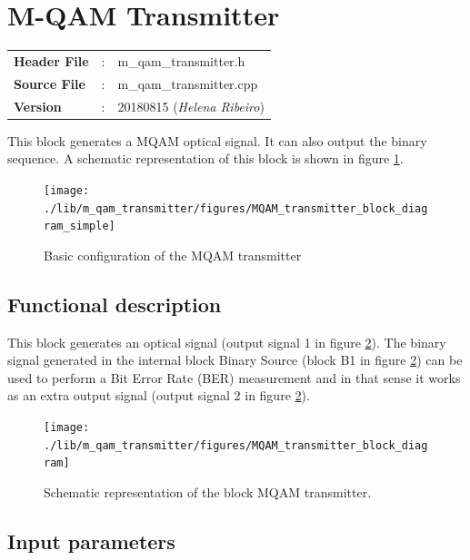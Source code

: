 \clearpage

\section{M-QAM Transmitter}

\begin{tcolorbox}	
	\begin{tabular}{p{2.75cm} p{0.2cm} p{10.5cm}} 	
		\textbf{Header File}   &:& m\_qam\_transmitter.h \\
		\textbf{Source File}   &:& m\_qam\_transmitter.cpp \\
        \textbf{Version}       &:& 20180815 (\emph{Helena Ribeiro})\\
	\end{tabular}
\end{tcolorbox}

This block generates a MQAM optical signal. It can also output the binary sequence. A schematic representation of this block is shown in figure \ref{MQAM_transmitter_block_diagram_simple}.

\begin{figure}[h]
	\centering
	\texttt{[image: ./lib/m\_qam\_transmitter/figures/MQAM\_transmitter\_block\_diagram\_simple]}
	\caption{Basic configuration of the MQAM transmitter}\label{MQAM_transmitter_block_diagram_simple}
\end{figure}

\subsection*{Functional description}

This block generates an optical signal (output signal 1 in figure \ref{MQAM_transmitter_block_diagram}). The binary signal generated in the internal block Binary Source (block B1 in figure \ref{MQAM_transmitter_block_diagram}) can be used to perform a Bit Error Rate (BER) measurement and in that sense it works as an extra output signal (output signal 2 in figure \ref{MQAM_transmitter_block_diagram}).

\begin{figure}[h]
	\centering
	\texttt{[image: ./lib/m\_qam\_transmitter/figures/MQAM\_transmitter\_block\_diagram]}
	\caption{Schematic representation of the block MQAM transmitter.}\label{MQAM_transmitter_block_diagram}
\end{figure}

\subsection*{Input parameters}

